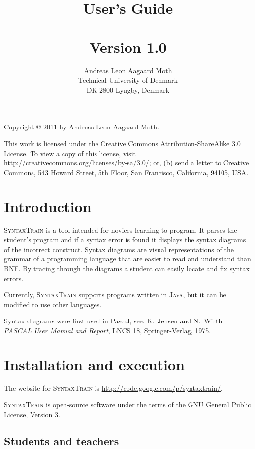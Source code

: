 \documentclass[11pt]{article}
\title{\st{}\\
User's Guide\\
\mbox{}\\\large{Version 1.0}}
\author{Andreas Leon Aagaard Moth\\
Technical University of Denmark\\
DK-2800 Lyngby, Denmark\\
}
\newcommand*{\st}{\textsc{SyntaxTrain}}
\newcommand*{\jv}{\textsc{Java}}
\begin{document}
\maketitle
\thispagestyle{empty}

\vfill

\begin{center}
Copyright \copyright{} 2011 by Andreas Leon Aagaard Moth.
\end{center}
This work is licensed under the Creative Commons Attribution-ShareAlike 3.0
License. To view a copy of this license, visit
\url{http://creativecommons.org/licenses/by-sa/3.0/}; or, (b) send a letter
to Creative Commons, 543 Howard Street, 5th Floor, San Francisco,
California, 94105, USA.

\newpage

\section{Introduction}

\st{} is a tool intended for novices learning to program. It parses the
student's program and if a syntax error is found it displays the syntax
diagrams of the incorrect construct. Syntax diagrams are visual
representations of the grammar of a programming language that are
easier to read and understand than BNF. By tracing through the diagrams
a student can easily locate and fix syntax errors.

Currently, \st{} supports programs written in \jv{}, but it can be
modified to use other languages.

Syntax diagrams were first used in Pascal; see: 
K.~Jensen and N.~Wirth.
\textit{PASCAL User Manual and Report}, LNCS 18, Springer-Verlag, 1975.

\section{Installation and execution}

The website for \st{} is \url{http://code.google.com/p/syntaxtrain/}.

\st{} is open-source software under the terms of the GNU General Public
License, Version 3.

\subsection*{Students and teachers}
\end{document}
